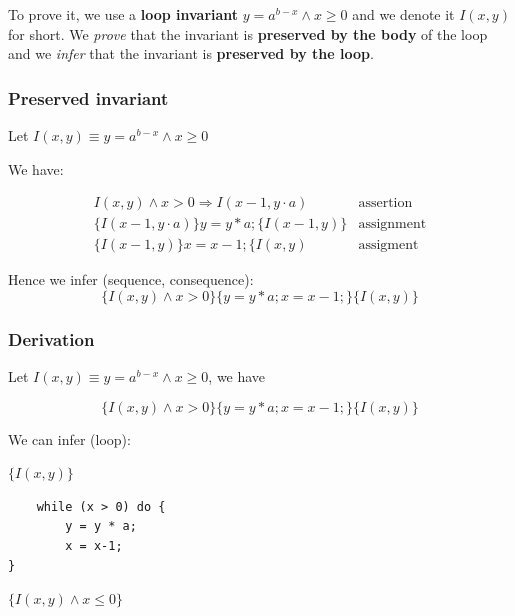 \documentclass[12pt, a4paper]{book}
\begin{document}
    To prove it, we use a \textbf{loop invariant} $y = {a}^{b-x} \land x \ge 0$
    and we denote it $I(x,y)$ for short. We \textit{prove} that the invariant
    is \textbf{preserved by the body} of the loop and we \textit{infer} that
    the invariant is \textbf{preserved by the loop}.

    \subsubsection{Preserved invariant}

    Let $I(x,y) \equiv y = {a}^{b-x} \land x \ge 0$ \newline

    We have:

    \begin{eqnarray*}
        I(x,y) \land x > 0 \Rightarrow I(x-1, y \cdot a) & \textrm{assertion} \\
        \{ I(x-1, y \cdot a) \} y = y * a; \{ I(x-1, y) \} & \textrm{assignment} \\
        \{ I(x-1, y) \} x = x - 1; \{ I(x,y) & \textrm{assigment}
    \end{eqnarray*}

    Hence we infer (sequence, consequence):
    $$
    \{ I(x,y) \land x > 0 \} \{ y = y*a; x=x-1; \} \{ I(x,y) \}
    $$

    \subsubsection{Derivation}

    Let $I(x,y) \equiv y = {a}^{b-x} \land x \ge 0$, we have

    $$
    \{ I(x,y) \land x > 0 \} \{ y=y*a; x=x-1; \} \{ I(x,y) \}
    $$

    We can infer (loop):

    \begin{minipage}{\linewidth}
        \begin{minipage}{0.3\linewidth}
            $\{ I(x,y) \}$
        \end{minipage}
        \begin{minipage}{0.3\linewidth}
\begin{lstlisting}
    while (x > 0) do {
        y = y * a;
        x = x-1;
}
\end{lstlisting}
        \end{minipage}
        \begin{minipage}{0.3\linewidth}
            $\{ I(x,y) \land x \le 0 \}$
        \end{minipage}
    \end{minipage}
\end{document}

